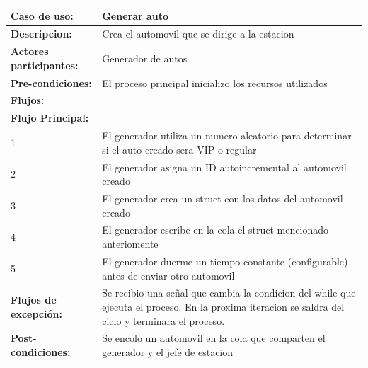 \documentclass[12pt,a4paper,spanish]{article}
\begin{document}
    \begin{tabular}{|p{4cm}|p{12cm}|}
    \hline
    \textbf{Caso de uso:} & Generar auto \\
    \hline
    \textbf{Descripcion:} &  Crea el automovil que se dirige a la estacion\\
    \hline
    \textbf{Actores participantes:} & Generador de autos  \\
    \hline
 
    \textbf{Pre-condiciones:} &  El proceso principal inicializo los recursos utilizados\\
    \hline
    \hline
    \textbf{Flujos:} &\\
    \hline
	\textbf{Flujo Principal:} &\\ 

	\hline
	1 & El generador utiliza un numero aleatorio para determinar si el auto creado sera VIP o regular\\
    \hline
	2 & El generador asigna un ID autoincremental al automovil creado\\
    \hline
	3 & El generador crea un struct con los datos del automovil creado\\
    \hline
	4 & El generador escribe en la cola el struct mencionado anteriomente\\
    \hline
	5 & El generador duerme un tiempo constante (configurable) antes de enviar otro automovil\\
    \hline
    \hline
	\textbf{Flujos de excepción:} & Se recibio una señal que cambia la condicion del while que ejecuta el proceso. En la proxima iteracion se saldra del ciclo y terminara el proceso.\\
    \hline
	\textbf{Post-condiciones:} & Se encolo un automovil en la cola que comparten el generador y el jefe de estacion\\
	\hline
	\end{tabular}

	\newpage
\end{document}
